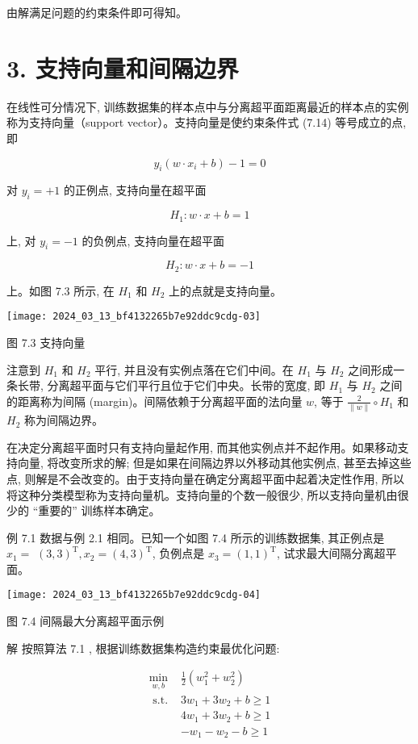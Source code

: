 \documentclass[10pt]{article}
\begin{document}
由解满足问题的约束条件即可得知。

\section*{3. 支持向量和间隔边界}
在线性可分情况下, 训练数据集的样本点中与分离超平面距离最近的样本点的实例称为支持向量（support vector）。支持向量是使约束条件式 (7.14) 等号成立的点, 即

$$
y_{i}\left(w \cdot x_{i}+b\right)-1=0
$$

对 $y_{i}=+1$ 的正例点, 支持向量在超平面

$$
H_{1}: w \cdot x+b=1
$$

上, 对 $y_{i}=-1$ 的负例点, 支持向量在超平面

$$
H_{2}: w \cdot x+b=-1
$$

上。如图 7.3 所示, 在 $H_{1}$ 和 $H_{2}$ 上的点就是支持向量。

\begin{center}
\texttt{[image: 2024\_03\_13\_bf4132265b7e92ddc9cdg-03]}
\end{center}

图 7.3 支持向量

注意到 $H_{1}$ 和 $H_{2}$ 平行, 并且没有实例点落在它们中间。在 $H_{1}$ 与 $H_{2}$ 之间形成一条长带, 分离超平面与它们平行且位于它们中央。长带的宽度, 即 $H_{1}$ 与 $H_{2}$ 之间的距离称为间隔 (margin)。间隔依赖于分离超平面的法向量 $w$, 等于 $\frac{2}{\|w\|} \circ H_{1}$ 和 $H_{2}$ 称为间隔边界。

在决定分离超平面时只有支持向量起作用, 而其他实例点并不起作用。如果移动支持向量, 将改变所求的解; 但是如果在间隔边界以外移动其他实例点, 甚至去掉这些点, 则解是不会改变的。由于支持向量在确定分离超平面中起着决定性作用, 所以将这种分类模型称为支持向量机。支持向量的个数一般很少, 所以支持向量机由很少的 “重要的” 训练样本确定。

例 7.1 数据与例 2.1 相同。已知一个如图 7.4 所示的训练数据集, 其正例点是 $x_{1}=$ $(3,3)^{\mathrm{T}}, x_{2}=(4,3)^{\mathrm{T}}$, 负例点是 $x_{3}=(1,1)^{\mathrm{T}}$, 试求最大间隔分离超平面。

\begin{center}
\texttt{[image: 2024\_03\_13\_bf4132265b7e92ddc9cdg-04]}
\end{center}

图 7.4 间隔最大分离超平面示例

解 按照算法 7.1 , 根据训练数据集构造约束最优化问题:

$$
\begin{array}{cl}
\min _{w, b} & \frac{1}{2}\left(w_{1}^{2}+w_{2}^{2}\right) \\
\text { s.t. } & 3 w_{1}+3 w_{2}+b \geqslant 1 \\
& 4 w_{1}+3 w_{2}+b \geqslant 1 \\
& -w_{1}-w_{2}-b \geqslant 1
\end{array}
$$
\end{document}
